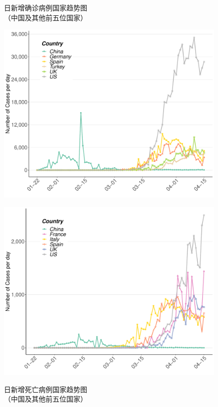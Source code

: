 \documentclass[
]{article}
\begin{document}
\begin{figure}[H]
\centering
\begin{minipage}[b]{0.48\linewidth}
\caption{日新增确诊病例国家趋势图\\（中国及其他前五位国家）}
\includegraphics[]{./input/covid2.pdf}
\label{}
\end{minipage}
\quad
\begin{minipage}[b]{0.48\linewidth}
\caption{日新增死亡病例国家趋势图\\（中国及其他前五位国家） }
\includegraphics[]{./input/covid3.pdf}
\label{}
\end{minipage}
\end{figure}
\end{document}
